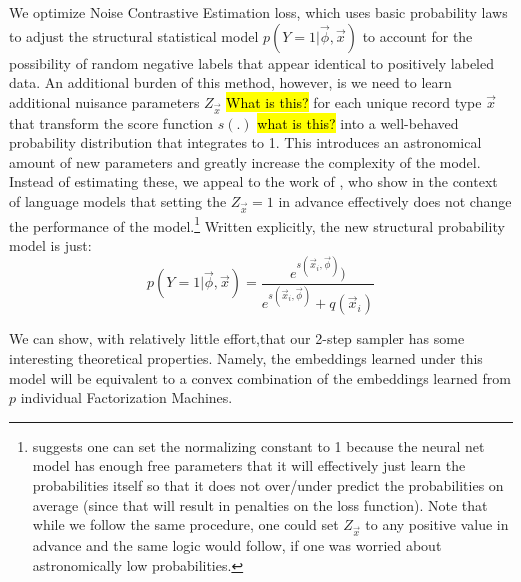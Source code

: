 \documentclass{article} %
\renewcommand{\cite}[1]{\citep{#1}}
\begin{document}
We optimize Noise Contrastive Estimation\cite{nce} loss, which uses basic probability laws to adjust the structural statistical model $p(Y=1|\vec{\phi},\vec{x})$ to account for the possibility of random negative labels that appear identical to positively labeled data. An additional burden of this method, however, is we need to learn additional nuisance parameters $Z_{\vec{x}}$ \hl{What is this?} for each unique record type $\vec{x}$ that transform the score function $s(.)$ \hl{what is this?} into a well-behaved probability distribution that integrates to 1. This introduces an astronomical amount of new parameters and greatly increase the complexity of the model. Instead of estimating these, we appeal to the work of \cite{fastnnlang}, who show in the context of language models that setting the $Z_{\vec{x}}=1$ in advance effectively does not change the performance of the model.\footnote{\cite{fastnnlang} suggests one can set the normalizing constant to 1 because the neural net model has enough free parameters that it will effectively just learn the probabilities itself so that it does not over/under predict the probabilities on average (since that will result in penalties on the loss function). Note that while we follow the same procedure, one could set $Z_{\vec{x}}$ to any positive value in advance and the same logic would follow, if one was worried about astronomically low probabilities.}  Written explicitly, the new structural probability model is just:
\begin{equation}
p(Y=1|\vec{\phi},\vec{x}) = \frac{e^{s(\vec{x}_i,\vec{\phi}) })}{e^{s(\vec{x}_i,\vec{\phi}) } + q(\vec{x}_i) }
\end{equation}

We can show, with relatively little effort,that our 2-step sampler has some interesting theoretical properties. Namely, the embeddings learned under this model will be equivalent to a convex combination of the embeddings learned from $p$ individual Factorization Machines. 
\end{document}
